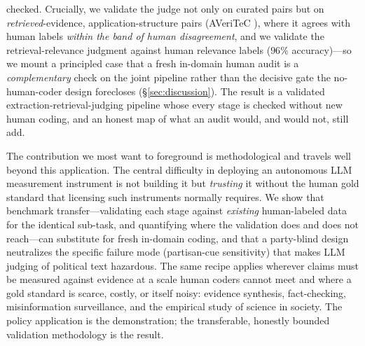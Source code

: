 checked. Crucially, we validate the judge not only on curated pairs but on \emph{retrieved}-evidence,
application-structure pairs (AVeriTeC \citep{schlichtkrull2023averitec}), where it agrees with human
labels \emph{within the band of human disagreement}, and we validate the retrieval-relevance judgment
against human relevance labels ($96\%$ accuracy)---so we mount a principled case that a fresh in-domain
human audit is a \emph{complementary} check on the joint pipeline rather than the decisive gate the
no-human-coder design forecloses (\S\ref{sec:discussion}). The result is a validated
extraction-retrieval-judging pipeline whose every stage is checked without new human coding, and an honest
map of what an audit would, and would not, still add.

The contribution we most want to foreground is methodological and travels well beyond this application.
The central difficulty in deploying an autonomous LLM measurement instrument is not building it but
\emph{trusting} it without the human gold standard that licensing such instruments normally requires. We
show that benchmark transfer---validating each stage against \emph{existing} human-labeled data for the
identical sub-task, and quantifying where the validation does and does not reach---can substitute for fresh
in-domain coding, and that a party-blind design neutralizes the specific failure mode (partisan-cue
sensitivity) that makes LLM judging of political text hazardous. The same recipe applies wherever claims
must be measured against evidence at a scale human coders cannot meet and where a gold standard is scarce,
costly, or itself noisy: evidence synthesis, fact-checking, misinformation surveillance, and the empirical
study of science in society. The policy application is the demonstration; the transferable, honestly
bounded validation methodology is the result.
